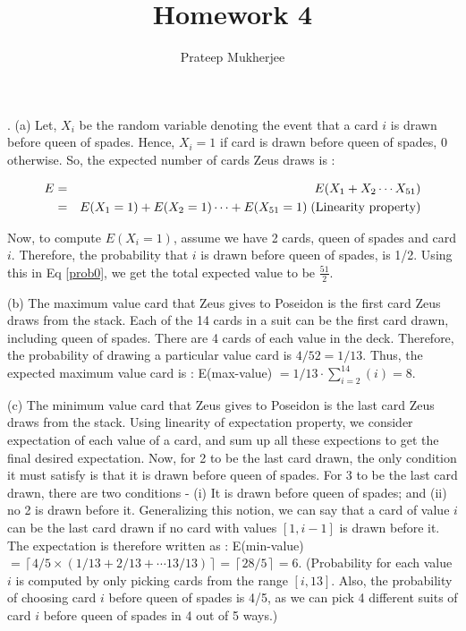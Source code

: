 \documentclass[assign]{article}
\title{Homework 4}
\author{Prateep Mukherjee}
\begin{document}
\maketitle

. (a) Let, $X_i$ be the random variable denoting the event that a card $i$ is drawn before queen of spades. Hence, $X_i = 1$ if card is drawn before queen of spades, 0 otherwise. So, the expected number of cards Zeus draws is : 

\vspace{-5pt}
\begin{eqnarray}
  E &=& E(X_1 + X_2 \cdots X_{51}) \notag  \\
     &=& E(X_1 = 1) + E(X_2 = 1 ) \cdots + E(X_{51} = 1) \;  \mbox{(Linearity property)} 
\label{prob0} 
\end{eqnarray} 

Now, to compute $E(X_i = 1)$, assume we have 2 cards,  queen of spades and card $i$. Therefore, the probability that $i$ is drawn before queen of spades, is 1/2. Using  this in Eq \ref{prob0}, we get the total expected value to be $\frac{51}{2}$.

\par (b) The maximum value card that Zeus gives to Poseidon is the first card Zeus draws from the stack. Each of the 14 cards in a suit can be the first card drawn, including queen of spades. There are 4 cards of each value in the deck. Therefore, the probability of drawing a particular value card is $4/52 = 1/13$. Thus, the expected maximum value card is : E(max-value) $= 1/13 \cdot \sum\limits_{i=2}^{14} (i) = 8$.

\par (c) The minimum value card that Zeus gives to Poseidon is the last card Zeus draws from the stack.  Using linearity of expectation property, we consider expectation of each value of a card, and sum up all these expections to get the final desired expectation. Now, for 2 to be the last card drawn, the only condition it must satisfy is that it is drawn before queen of spades. For 3 to be the last card drawn, there are two conditions - (i) It is drawn before queen of spades; and (ii) no 2 is drawn before it. Generalizing this notion, we can say that a card of value $i$ can be the last card drawn if no card with values $[1,i-1]$ is drawn before it. The expectation is therefore written as : E(min-value) $= \left \lceil 4/5 \times (1/13 + 2/13 + \cdots 13/13) \right \rceil = \left \lceil 28/5 \right \rceil = 6$. (Probability for each value $i$ is computed by only picking cards from the range $[i,13]$. Also, the probability of choosing card $i$ before queen of spades is 4/5, as we can pick 4 different suits of card $i$ before queen of spades in 4 out of 5 ways.)
\end{document}
